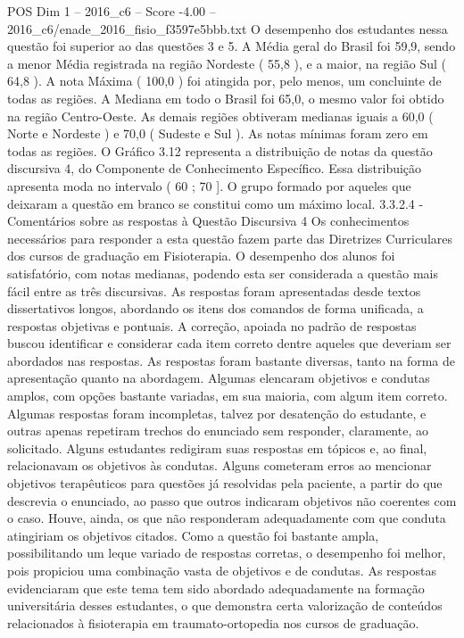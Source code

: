 \begin{textsample}{POS Dim 1 – 2016\_c6 – Score -4.00 – 2016\_c6/enade\_2016\_fisio\_f3597e5bbb.txt}
O desempenho dos estudantes nessa questão foi superior ao das questões 3 e 5.
A Média geral do Brasil foi 59,9, sendo a menor Média registrada na região Nordeste ( 55,8 ), e a maior, na região Sul ( 64,8 ).
A nota Máxima ( 100,0 ) foi atingida por, pelo menos, um concluinte de todas as regiões.
A Mediana em todo o Brasil foi 65,0, o mesmo valor foi obtido na região Centro-Oeste.
As demais regiões obtiveram medianas iguais a 60,0 ( Norte e Nordeste ) e 70,0 ( Sudeste e Sul ).
As notas mínimas foram zero em todas as regiões.
O Gráfico 3.12 representa a distribuição de notas da questão discursiva 4, do Componente de Conhecimento Específico.
Essa distribuição apresenta moda no intervalo ( 60 ; 70 ].
O grupo formado por aqueles que deixaram a questão em branco se constitui como um máximo local. 3.3.2.4 - Comentários sobre as respostas à Questão Discursiva 4 Os conhecimentos necessários para responder a esta questão fazem parte das Diretrizes Curriculares dos cursos de graduação em Fisioterapia.
O desempenho dos alunos foi satisfatório, com notas medianas, podendo esta ser considerada a questão mais fácil entre as três discursivas.
As respostas foram apresentadas desde textos dissertativos longos, abordando os itens dos comandos de forma unificada, a respostas objetivas e pontuais.
A correção, apoiada no padrão de respostas buscou identificar e considerar cada item correto dentre aqueles que deveriam ser abordados nas respostas.
As respostas foram bastante diversas, tanto na forma de apresentação quanto na abordagem.
Algumas elencaram objetivos e condutas amplos, com opções bastante variadas, em sua maioria, com algum item correto.
Algumas respostas foram incompletas, talvez por desatenção do estudante, e outras apenas repetiram trechos do enunciado sem responder, claramente, ao solicitado.
Alguns estudantes redigiram suas respostas em tópicos e, ao final, relacionavam os objetivos às condutas.
Alguns cometeram erros ao mencionar objetivos terapêuticos para questões já resolvidas pela paciente, a partir do que descrevia o enunciado, ao passo que outros indicaram objetivos não coerentes com o caso.
Houve, ainda, os que não responderam adequadamente com que conduta atingiriam os objetivos citados.
Como a questão foi bastante ampla, possibilitando um leque variado de respostas corretas, o desempenho foi melhor, pois propiciou uma combinação vasta de objetivos e de condutas.
As respostas evidenciaram que este tema tem sido abordado adequadamente na formação universitária desses estudantes, o que demonstra certa valorização de conteúdos relacionados à fisioterapia em traumato-ortopedia nos cursos de graduação.

\end{textsample}
